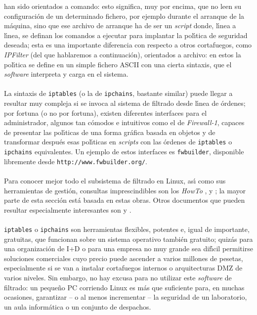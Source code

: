 han sido orientados a comando: esto significa, muy por encima, que no leen su
configuraci\'on de un determinado fichero, por ejemplo durante el arranque de
la m\'aquina, sino que ese archivo de arranque ha de ser un {\it script} donde,
l\'{\i}nea a l\'{\i}nea, se definan los comandos a ejecutar para implantar la
pol\'{\i}tica de seguridad deseada; esta es una importante diferencia con 
respecto a otros cortafuegos, como {\it IPFilter} (del que hablaremos a 
continuaci\'on), orientados a archivo: en estos la pol\'{\i}tica se define en 
un simple fichero ASCII con una cierta sintaxis, que el {\it software} 
interpreta y carga en el sistema.\\
\\La sintaxis de {\tt iptables} (o la de {\tt ipchains}, bastante similar) puede
llegar a resultar muy compleja si se invoca al sistema de filtrado desde 
l\'{\i}nea de \'ordenes; por fortuna (o no por fortuna), existen diferentes
interfaces para el administrador, algunos tan c\'omodos e intuitivos como el de 
{\it Firewall-1}, capaces de presentar las pol\'{\i}ticas de una forma 
gr\'afica basada en objetos y de transformar despu\'es
esas pol\'{\i}ticas en {\it scripts} con las \'ordenes de {\tt iptables} o {\tt
ipchains} equivalentes. Un ejemplo de estos interfaces es {\tt fwbuilder},
disponible libremente desde {\tt http://www.fwbuilder.org/}.\\
\\Para conocer mejor todo el subsistema de filtrado en Linux, as\'{\i} como sus
herramientas de gesti\'on, consultas imprescindibles son los {\it HowTo} 
\cite{kn:rus00}, \cite{kn:rus02} y \cite{kn:gren00}; la mayor parte de esta 
secci\'on est\'a basada en estas obras. Otros documentos que pueden resultar
especialmente interesantes son \cite{kn:mou00} y \cite{kn:zie01}.\\
\\{\tt iptables} o {\tt ipchains} son herramientas flexibles, potentes e, igual 
de importante, gratuitas, que funcionan sobre un sistema operativo tambi\'en 
gratuito; quiz\'as para una organizaci\'on de I+D o para una empresa no muy 
grande sea dif\'{\i}cil permitirse soluciones comerciales cuyo precio puede 
ascender a varios millones de pesetas, especialmente si se van a instalar 
cortafuegos internos o arquitecturas DMZ de varios niveles. Sin embargo, no hay 
excusa para no utilizar este {\it software} de filtrado: un peque\~no PC 
corriendo Linux es m\'as que suficiente para, en muchas ocasiones, garantizar 
-- o al menos incrementar -- la seguridad de un laboratorio, un aula 
inform\'atica o un conjunto de despachos.
